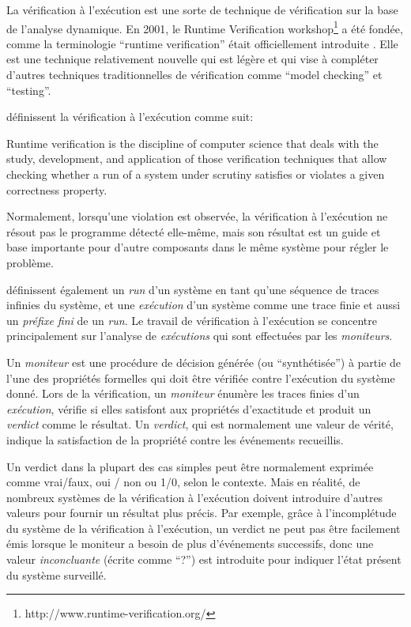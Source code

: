 La vérification à l'exécution est une sorte de technique de vérification sur la base de l'analyse dynamique. En 2001, le Runtime Verification workshop\footnote{http://www.runtime-verification.org/} a été fondée, comme la terminologie ``runtime verification'' était officiellement introduite \citep{wiki:rv}. Elle est une technique relativement nouvelle qui est légère et qui vise à compléter d'autres techniques traditionnelles de vérification comme ``model checking'' et ``testing''.

\cite{leucker2009brief} définissent la vérification à l'exécution comme suit:

\begin{displayquote}
Runtime verification is the discipline of computer science that deals with the study, development, and application of those verification techniques that allow checking whether a run of a system under scrutiny satisfies or violates a given correctness property.
\end{displayquote}

Normalement, lorsqu'une violation est observée, la vérification à l'exécution ne résout pas le programme détecté elle-même, mais son résultat est un guide et base importante pour d'autre composants dans le même système pour régler le problème.

\cite{leucker2009brief} définissent également un \emph{run} d'un système en tant qu'une séquence de traces infinies du système, et une \emph{exécution} d'un système comme une trace finie et aussi un \emph{préfixe fini} de un \emph{run}. Le travail de vérification à l'exécution se concentre principalement sur l'analyse de \emph{exécutions} qui sont effectuées par les \emph{moniteurs}.

Un \emph{moniteur} est une procédure de décision générée (ou ``synthétisée'') à partie de l'une des propriétés formelles qui doit être vérifiée contre l'exécution du système donné. Lors de la vérification, un \emph{moniteur} énumère les traces finies d'un \emph{exécution}, vérifie si elles satisfont aux propriétés d'exactitude et produit un \emph{verdict} comme le résultat. Un \emph{verdict}, qui est normalement une valeur de vérité, indique la satisfaction de la propriété contre les événements recueillis.

Un verdict dans la plupart des cas simples peut être normalement exprimée comme vrai/faux, oui / non ou 1/0, selon le contexte. Mais en réalité, de nombreux systèmes de la vérification à l'exécution doivent introduire d'autres valeurs pour fournir un résultat plus précis. Par exemple, grâce à l'incomplétude du système de la vérification à l'exécution, un verdict ne peut pas être facilement émis lorsque le moniteur a besoin de plus d'événements successifs, donc une valeur \emph{inconcluante} (écrite comme ``?'') est introduite pour indiquer l'état présent du système surveillé. \citep{falcone2013tutorial}

